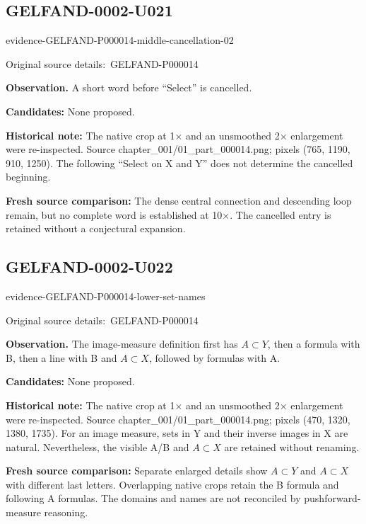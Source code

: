 \documentclass[11pt]{article}
\newcommand{\EvidenceBlock}[4]{%
 \par\smallskip\noindent\begin{minipage}{\linewidth}
 \begin{minipage}[t]{.47\linewidth}\vspace{0pt}\centering
 \csname evidence-#1-#2\endcsname\par
 {\scriptsize\SourceCropCaption\ #1}\par
 \end{minipage}\hfill
 \begin{minipage}[t]{.49\linewidth}\vspace{0pt}\raggedright
 {\small\color{orange!65!black}\textbf{#4} #3}\par
 \end{minipage}
 \end{minipage}\par\smallskip}
\newcommand{\SourceCropCaption}{Original source details:}\newcommand{\ReadingCaption}{Uncertain reading.}\newcommand{\IncompleteCaption}{Undeciphered passage.}\newcommand{\DiagramCaption}{Diagram and typed description.}
\begin{document}
\subsection*{GELFAND-0002-U021}
\EvidenceBlock{GELFAND-P000014}{middle-cancellation-02}{A short word before “Select” is cancelled.}{Observation.}
\par\smallskip\noindent\textbf{Candidates: } None proposed.\par
\par\smallskip\noindent\textbf{Historical note: } The native crop at 1× and an unsmoothed 2× enlargement were re-inspected. Source chapter\_001/01\_part\_000014.png; pixels (765, 1190, 910, 1250). The following “Select on X and Y” does not determine the cancelled beginning.\par
\par\smallskip\noindent\textbf{Fresh source comparison: } The dense central connection and descending loop remain, but no complete word is established at 10×. The cancelled entry is retained without a conjectural expansion.\par

\subsection*{GELFAND-0002-U022}
\EvidenceBlock{GELFAND-P000014}{lower-set-names}{The image-measure definition first has \(A\subset Y\), then a formula with B, then a line with B and \(A\subset X\), followed by formulas with A.}{Observation.}
\par\smallskip\noindent\textbf{Candidates: } None proposed.\par
\par\smallskip\noindent\textbf{Historical note: } The native crop at 1× and an unsmoothed 2× enlargement were re-inspected. Source chapter\_001/01\_part\_000014.png; pixels (470, 1320, 1380, 1735). For an image measure, sets in Y and their inverse images in X are natural. Nevertheless, the visible A/B and \(A\subset X\) are retained without renaming.\par
\par\smallskip\noindent\textbf{Fresh source comparison: } Separate enlarged details show \(A\subset Y\) and \(A\subset X\) with different last letters. Overlapping native crops retain the B formula and following A formulas. The domains and names are not reconciled by pushforward-measure reasoning.\par
\end{document}
